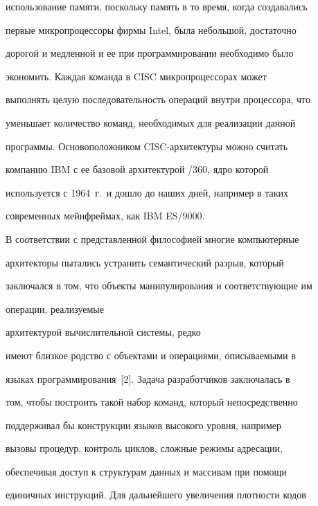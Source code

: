 использование памяти, поскольку память в то время, когда создавались 


первые микропроцессоры фирмы Intel, была небольшой, достаточно 


дорогой и медленной и ее при программировании необходимо было 


экономить. Каждая команда в CISC микропроцессорах может 


выполнять целую последовательность операций внутри процессора, что 


уменьшает количество команд, необходимых для реализации данной 


программы. Основоположником CISC-архитектуры можно считать 


компанию IBM с ее базовой архитектурой /360, ядро которой 


используется с 1964~г.\ и дошло до наших дней, например в таких 


современных мейнфреймах, как IBM ES/9000.





В соответствии с представленной философией многие компьютерные 


архитекторы пытались устранить семантический разрыв, который 


заключался в том, что объекты манипулирования и соответствующие им 


операции, реализуемые\linebreak\vspace*{-12pt}


\pagebreak





\noindent


 архитектурой вычислительной системы, редко 


имеют близкое родство с объектами и операциями, описываемыми в 


языках программирования~[2]. Задача разработчиков заключалась в 


том, чтобы построить такой набор команд, который непосредственно 


поддерживал  бы конструкции языков высокого уровня, например 


вызовы процедур, контроль циклов, сложные режимы адресации, 


обеспечивая доступ к структурам данных и массивам  при помощи 


единичных инструкций. Для дальнейшего увеличения плотности кодов 


